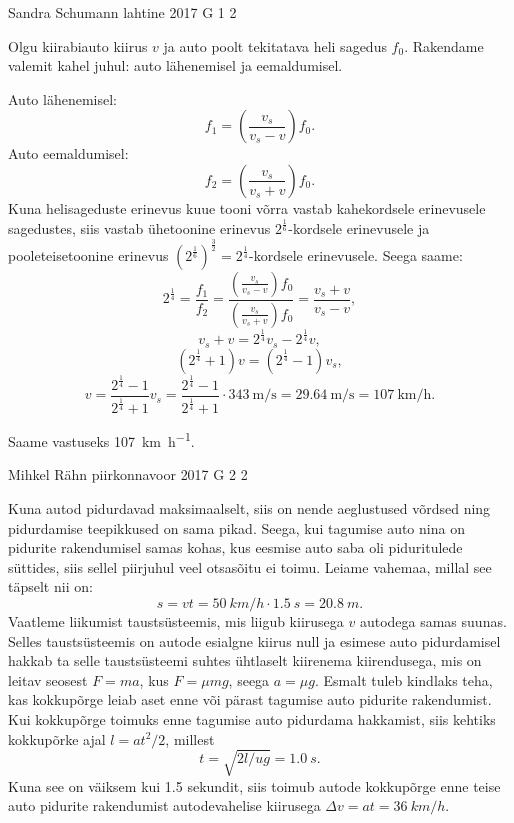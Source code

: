 \documentclass[11pt]{article}
\begin{document}
{%
{Sandra Schumann} %
{lahtine} %
{2017} %
{G 1} %
{2} %
{

\ifSolution
Olgu kiirabiauto kiirus $v$ ja auto poolt tekitatava heli sagedus $f_0$. Rakendame valemit kahel juhul: auto lähenemisel ja eemaldumisel.

Auto lähenemisel:
\[f_1 = \left(\frac{v_s}{v_s - v}\right)f_0.\]
Auto eemaldumisel:
\[f_2 = \left(\frac{v_s}{v_s + v}\right)f_0.\]
Kuna helisageduste erinevus kuue tooni võrra vastab kahekordsele erinevusele sagedustes, siis vastab ühetoonine erinevus $2^{\frac 1 6}$-kordsele erinevusele ja pooleteisetoonine erinevus $\left(2^{\frac 1 6}\right)^{\frac 3 2} = 2^{\frac 1 4}$-kordsele erinevusele. Seega saame:
\[2^{\frac 1 4} = \frac{f_1}{f_2} = \frac{(\frac{v_s}{v_s - v})f_0}{(\frac{v_s}{v_s + v})f_0} = \frac{v_s + v}{v_s - v},\]
\[v_s + v = 2^{\frac 1 4}v_s - 2^{\frac 1 4}v,\]
\[(2^{\frac 1 4} + 1)v = (2^{\frac 1 4} - 1)v_s,\]
\[v = \frac{2^{\frac 1 4} - 1}{2^{\frac 1 4} + 1}v_s = \frac{2^{\frac 1 4} - 1}{2^{\frac 1 4} + 1} \cdot \SI{343}{\meter\per\second} = \SI{29.64}{\meter\per\second} = \SI{107}{\kilo\meter\per\hour}. \]

Saame vastuseks \SI{107}{\kilo\meter\per\hour}.
\fi
}

{Mihkel Rähn} %
{piirkonnavoor} %
{2017} %
{G 2} %
{2} %
{

\ifSolution
\osa Kuna autod pidurdavad maksimaalselt, siis on nende aeglustused võrdsed ning pidurdamise teepikkused on sama pikad. Seega, kui tagumise auto nina on pidurite rakendumisel samas kohas, kus eesmise auto saba oli piduritulede süttides, siis sellel piirjuhul veel otsasõitu ei toimu. Leiame vahemaa, millal see täpselt nii on:
\[
s=vt=\SI{50}{km/h}\cdot\SI{1,5}{s}=\SI{20,8}{m}.
\]
\osa Vaatleme liikumist taustsüsteemis, mis liigub kiirusega $v$ autodega samas suunas. Selles taustsüsteemis on autode esialgne kiirus null ja esimese auto pidurdamisel hakkab ta selle taustsüsteemi suhtes ühtlaselt kiirenema kiirendusega, mis on leitav seosest $F=ma$, kus $F=\mu mg$, seega $a=\mu g$. Esmalt tuleb kindlaks teha, kas kokkupõrge leiab aset enne või pärast tagumise auto pidurite rakendumist. Kui kokkupõrge toimuks enne tagumise auto pidurdama hakkamist, siis kehtiks kokkupõrke ajal $l=at^2/2$, millest
\[
t=\sqrt{2l/ug}=\SI{1.0}{s}.
\]
Kuna see on väiksem kui \num{1,5} sekundit, siis toimub autode kokkupõrge enne teise auto pidurite rakendumist autodevahelise kiirusega $\Delta v=at=\SI{36}{km/h}$.
\fi
}

}
\end{document}
